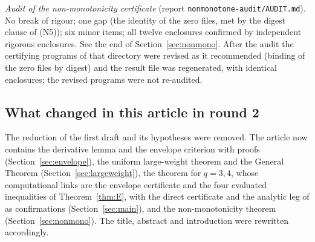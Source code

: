 \documentclass[11pt]{amsart}
\theoremstyle{definition}
\numberwithin{equation}{section}
\begin{document}
\emph{Audit of the non-monotonicity certificate} (report
\texttt{nonmonotone-audit/AUDIT.md}). No break of rigour; one gap
(the identity of the zero files, met by the digest clause of (N5));
six minor items; all twelve enclosures confirmed by independent
rigorous enclosures. See the end of Section~\ref{sec:nonmono}. After
the audit the certifying programs of that directory were revised as
it recommended (binding of the zero files by digest) and the result
file was regenerated, with identical enclosures; the revised programs
were not re-audited.

\subsection*{What changed in this article in round 2}
The reduction of the first draft and its hypotheses were removed. The
article now contains the derivative lemma and the envelope criterion
with proofs (Section~\ref{sec:envelope}), the uniform large-weight
theorem and the General Theorem (Section~\ref{sec:largeweight}), the
theorem for $q=3,4$, whose computational links are the envelope
certificate and the four evaluated inequalities of
Theorem~\ref{thm:E}, with the direct certificate and the analytic leg
of \cite{WR} as confirmations (Section~\ref{sec:main}), and the
non-monotonicity theorem (Section~\ref{sec:nonmono}). The title,
abstract and introduction were rewritten accordingly.
\end{document}
